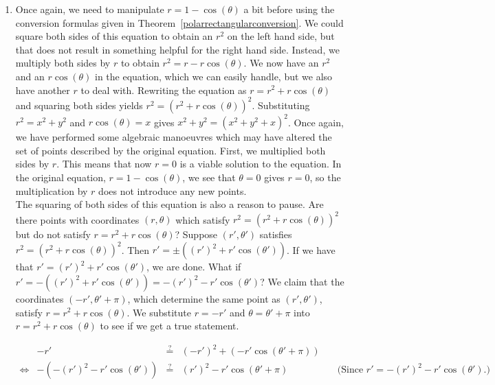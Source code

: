 \begin{example}
\begin{enumerate}
\begin{enumerate}
\item  Once again, we need to manipulate   $r = 1 - \cos(\theta)$ a bit before using the conversion formulas given in Theorem~\ref{polarrectangularconversion}.  We could square both sides of this equation to obtain an $r^2$ on the left hand side, but that does not result in something helpful for the right hand side.  Instead, we multiply both sides by $r$ to obtain  $r^{2} = r - r\cos(\theta)$.  We now have an $r^2$ and an $r\cos(\theta)$ in the equation, which we can easily handle, but we also have another $r$ to deal with.  Rewriting the equation as $r = r^{2} + r\cos(\theta)$ and squaring both sides yields $r^2 = \left(r^2 + r\cos(\theta)\right)^2$.  Substituting $r^2 = x^2 + y^2$ and $r\cos(\theta) = x$ gives   $x^2 + y^2 = \left(x^2 + y^2 + x\right)^2$.  Once again, we have performed some algebraic manoeuvres which may have altered the set of points described by the original equation.  First, we multiplied both sides by $r$.  This means that now $r=0$ is a viable solution to the equation.  In the original equation, $r = 1 - \cos(\theta)$, we see that $\theta = 0$ gives $r=0$, so the multiplication by $r$ does not introduce any new points.\\ The squaring of both sides of this equation is also a reason to pause.  Are there points with coordinates $(r,\theta)$ which satisfy $r^2 = \left(r^2 + r\cos(\theta)\right)^2$ but do not satisfy $r = r^2 + r\cos(\theta)$?  Suppose $\left(r',\theta'\right)$ satisfies $r^2 = \left(r^2 + r\cos(\theta)\right)^2$.  Then $r' = \pm \left((r')^2 + r'\cos(\theta')\right)$.  If we have that $r' = (r')^2 + r'\cos(\theta')$, we are done.  What if $r' = -\left((r')^2 + r'\cos(\theta')\right) = -(r')^{2} - r'\cos(\theta')$?  We claim that the coordinates $(-r', \theta' + \pi)$, which determine the same point as $(r',\theta')$, satisfy $r = r^2 + r\cos(\theta)$. We substitute $r =  -r'$ and $\theta = \theta' + \pi$ into $r = r^2 + r\cos(\theta)$ to see if we get a true statement.

\[ \begin{array}{rrclr}

&-r' & \stackrel{\text{?}}{=}  & \left(-r'\right)^2 + \left(-r' \cos(\theta' + \pi)\right) & \\ [5pt]

\Leftrightarrow&-\left(-(r')^2 - r'\cos(\theta') \right)   & \stackrel{\text{?}}{=}  & (r')^2 - r' \cos(\theta' + \pi) & \quad\text{(Since $r' = -(r')^{2} - r'\cos(\theta')$.)} \\[5pt]


\end{array}\]
\end{enumerate}
\end{enumerate}
\end{example}
